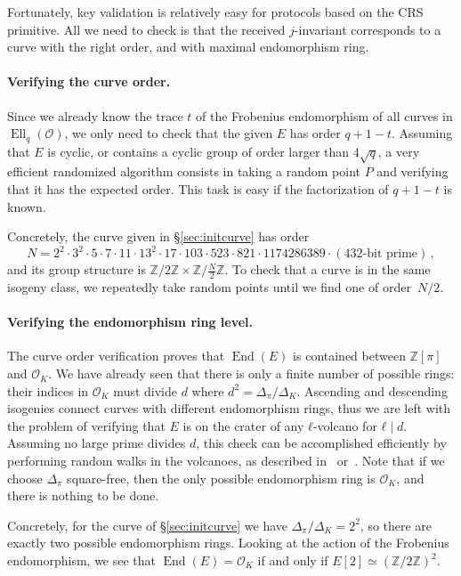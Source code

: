 \documentclass{llncs}
\renewcommand{\O}{\mathcal{O}}
\DeclareMathOperator{\End}{End}
\DeclareMathOperator{\Ell}{Ell}
\begin{document}
Fortunately, key validation is relatively easy for protocols based on
the CRS primitive. 
All we need to check is that the received $j$-invariant
corresponds to a curve with the right order, and with maximal endomorphism ring. 

\paragraph{Verifying the curve order.} Since we already know the trace $t$
of the Frobenius endomorphism of all curves in $\Ell_q(\O)$, 
we only need to check that the given $E$ has order $q+1-t$.
Assuming that $E$ is cyclic, or contains a
cyclic group of order larger than $4\sqrt{q}$, a very efficient
randomized algorithm consists in taking a random point $P$ and
verifying that it has the expected order.  This task is easy if the
factorization of $q+1-t$ is known.

Concretely, the curve given in \S\ref{sec:initcurve} has order
\[
    N 
    = 
    2^2 · 3^2 · 5 · 7 · 11 · 13^2 · 17 · 103 · 523 · 821 · 1174286389
    · (\text{432-bit prime})
    \,,
\] %
and its group structure is
$ℤ/2ℤ×ℤ/\frac{N}{2}ℤ$. To check that a curve is in the same isogeny
class, we repeatedly take random points until we find one of order~$N/2$.

\paragraph{Verifying the endomorphism ring level.} 
The curve order verification proves that $\End(E)$ 
is contained between $ℤ[π]$ and $\O_K$. 
We have already seen that there is only a finite number of
possible rings: their indices in $\O_K$ must divide $d$ where $d^2=Δ_π/Δ_K$.
Ascending and descending isogenies connect curves with different endomorphism
rings, thus we are left with the problem of verifying that $E$ is on
the crater of any $ℓ$-volcano for $ℓ\mid d$.
Assuming no large prime divides $d$, this check can be
accomplished efficiently by performing random walks in the volcanoes,
as described in~\cite[\S4.2]{kohel} or~\cite{fouquet+morain02}. 
Note that if we choose $Δ_π$ square-free, 
then the only possible endomorphism ring is $\O_K$,
and there is nothing to be done.

Concretely, for the curve of \S\ref{sec:initcurve}
we have $Δ_π/Δ_K=2^2$,
so there are exactly two possible endomorphism rings. Looking at
the action of the Frobenius endomorphism, we see that $\End(E)=\O_K$
if and only if $E[2]≃(ℤ/2ℤ)^2$.
\end{document}
